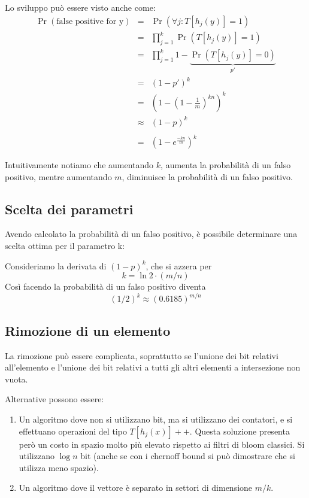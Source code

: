 \documentclass[a4paper,11pt]{book}
\begin{document}
Lo sviluppo pu\`o essere visto anche come:
\begin{eqnarray}
\Pr(\mbox{false positive for y}) & = & \Pr( \forall j : T[h_j (y)] = 1) \nonumber \\
& = & \prod^{k}_{j = 1} \Pr(T[h_j (y)] = 1) \nonumber \\
& = & \prod^{k}_{j = 1} 1 - \underbrace{\Pr(T[h_j (y)] = 0)}_{p'} \nonumber \\
& = & (1 - p')^k \nonumber \\
& = & \left(1 - \left( 1 - \frac{1}{m}\right)^{kn}\right)^k
 \nonumber \\
& \approx & (1 - p)^k \nonumber \\ \nonumber \\
& = & \left(1 - e^{\frac{-kn}{m}}\right)^k \nonumber
\end{eqnarray}

Intuitivamente notiamo che aumentando $k$, aumenta la probabilit\`a di un falso positivo, mentre aumentando $m$, diminuisce la probabilit\`a di un falso positivo.

\subsection{Scelta dei parametri}

Avendo calcolato la probabilit\`a di un falso positivo, \`e possibile determinare una scelta ottima per il parametro k:

Consideriamo la derivata di $(1 - p)^k$, che si azzera per $$k = \ln 2 \cdot (m/n)$$
Cos\`i facendo la probabilit\`a di un falso positivo diventa $$(1/2)^k \approx (0.6185)^{m/n}$$

\subsection{Rimozione di un elemento}

La rimozione pu\`o essere complicata, soprattutto se l'unione dei bit relativi all'elemento e l'unione dei bit relativi a tutti gli altri elementi a intersezione non vuota.

Alternative possono essere:
\begin{enumerate}
\item Un algoritmo dove non si utilizzano bit, ma si utilizzano dei contatori, e si effettuano operazioni del tipo $T[h_j (x)]++$. Questa soluzione presenta per\`o un costo in spazio molto pi\`u elevato rispetto ai filtri di bloom classici. Si utilizzano $\log n$ bit (anche se con i chernoff bound si pu\`o dimostrare che si utilizza meno spazio).
\item Un algoritmo dove il vettore \`e separato in settori di dimensione $m/k$.
\end{enumerate}
\end{document}
